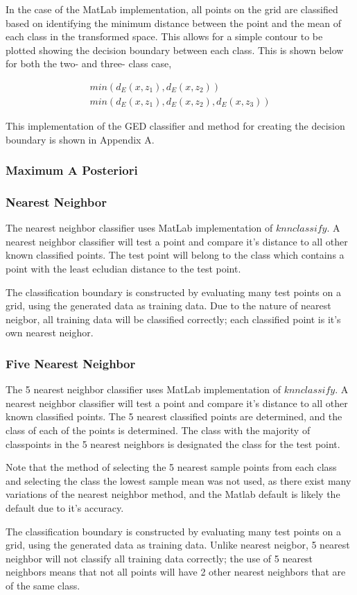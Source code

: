 In the case of the MatLab implementation, all points on the grid are classified based on identifying the minimum distance between the point and the mean of each class in the transformed space. This allows for a simple contour to be plotted showing the decision boundary between each class. This is shown below for both the two- and three- class case,

\begin{eqnarray}
\label{eqn:pointClass-GED}
min(d_{E} (x,z_{1}), d_{E} (x,z_{2})) \\
min(d_{E} (x,z_{1}), d_{E} (x,z_{2}), d_{E} (x,z_{3}))
\end{eqnarray}


This implementation of the GED classifier and method for creating the decision boundary is shown in Appendix A.

\subsubsection{Maximum A Posteriori}

\subsubsection{Nearest Neighbor}

The nearest neighbor classifier uses MatLab implementation of $knnclassify$. A nearest neighbor classifier will test a point and compare it's distance to all other known classified points. The test point will belong to the class which contains a point with the least ecludian distance to the test point.

The classification boundary is constructed by evaluating many test points on a grid, using the generated data as training data. Due to the nature of nearest neigbor, all training data will be classified correctly; each classified point is it's own nearest neighor.

\subsubsection{Five Nearest Neighbor}

The 5 nearest neighbor classifier uses MatLab implementation of $knnclassify$. A nearest neighbor classifier will test a point and compare it's distance to all other known classified points. The 5 nearest classified points are determined, and the class of each of the points is determined. The class with the majority of classpoints in the 5 nearest neighbors is designated the class for the test point.

Note that the method of selecting the 5 nearest sample points from each class and selecting the class the lowest sample mean was not used, as there exist many variations of the nearest neighbor method, and the Matlab default is likely the default due to it's accuracy.

The classification boundary is constructed by evaluating many test points on a grid, using the generated data as training data. Unlike nearest neigbor, 5 nearest neighbor will not classify all training data correctly; the use of 5 nearest neighbors means that not all points will have 2 other nearest neighbors that are of the same class.
